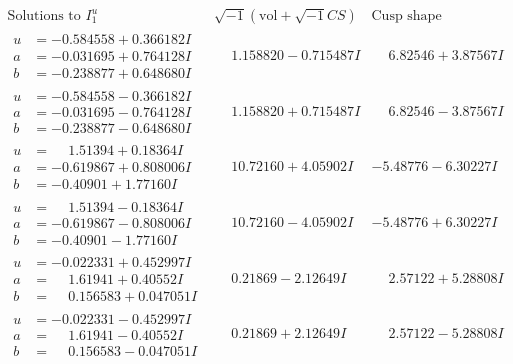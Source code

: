 \documentclass[1p]{elsarticle_modified}
\theoremstyle{definition}
\newcommand{\I}{\sqrt{-1}}
\begin{document}
$$\begin{array}{c|c|c}  
\text{Solutions to }I^u_{1}& \I (\text{vol} + \sqrt{-1}CS) & \text{Cusp shape}\\
 \hline 
\begin{aligned}
u &= -0.584558 + 0.366182 I \\
a &= -0.031695 + 0.764128 I \\
b &= -0.238877 + 0.648680 I\end{aligned}
 & \phantom{-}1.158820 - 0.715487 I & \phantom{-}6.82546 + 3.87567 I \\ \hline\begin{aligned}
u &= -0.584558 - 0.366182 I \\
a &= -0.031695 - 0.764128 I \\
b &= -0.238877 - 0.648680 I\end{aligned}
 & \phantom{-}1.158820 + 0.715487 I & \phantom{-}6.82546 - 3.87567 I \\ \hline\begin{aligned}
u &= \phantom{-}1.51394 + 0.18364 I \\
a &= -0.619867 + 0.808006 I \\
b &= -0.40901 + 1.77160 I\end{aligned}
 & \phantom{-}10.72160 + 4.05902 I & -5.48776 - 6.30227 I \\ \hline\begin{aligned}
u &= \phantom{-}1.51394 - 0.18364 I \\
a &= -0.619867 - 0.808006 I \\
b &= -0.40901 - 1.77160 I\end{aligned}
 & \phantom{-}10.72160 - 4.05902 I & -5.48776 + 6.30227 I \\ \hline\begin{aligned}
u &= -0.022331 + 0.452997 I \\
a &= \phantom{-}1.61941 + 0.40552 I \\
b &= \phantom{-}0.156583 + 0.047051 I\end{aligned}
 & \phantom{-}0.21869 - 2.12649 I & \phantom{-}2.57122 + 5.28808 I \\ \hline\begin{aligned}
u &= -0.022331 - 0.452997 I \\
a &= \phantom{-}1.61941 - 0.40552 I \\
b &= \phantom{-}0.156583 - 0.047051 I\end{aligned}
 & \phantom{-}0.21869 + 2.12649 I & \phantom{-}2.57122 - 5.28808 I \\ \hline\begin{aligned}

\end{aligned}
\end{array}$$
\end{document}
